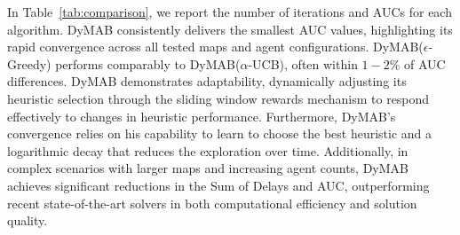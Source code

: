 \documentclass[review]{jair}
\begin{document}
In Table~\ref{tab:comparison}, we report the number of iterations and AUCs for each algorithm. DyMAB consistently delivers the smallest AUC values, highlighting its rapid convergence across all tested maps and agent configurations. DyMAB($\epsilon$-Greedy) performs comparably to DyMAB($\alpha$-UCB), often within $1-2\%$ of AUC differences.
DyMAB demonstrates adaptability, dynamically adjusting its heuristic selection through the sliding window rewards mechanism to respond effectively to changes in heuristic performance. Furthermore, DyMAB’s convergence relies on his capability to learn to choose the best heuristic and a logarithmic decay that reduces the exploration over time. Additionally, in complex scenarios with larger maps and increasing agent counts, DyMAB achieves significant reductions in the Sum of Delays and AUC, outperforming recent state-of-the-art solvers in both computational efficiency and solution quality. 
\end{document}
